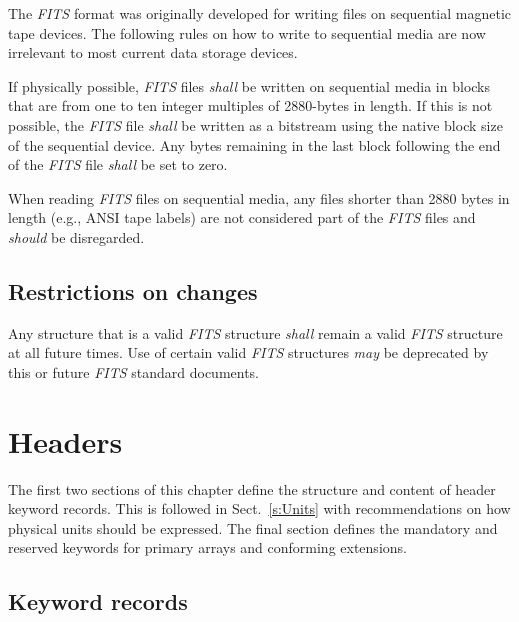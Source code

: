 \documentclass[onecolumn]{aa}
\begin{document}
The {\em FITS\/} format was originally developed for writing files
on sequential magnetic tape devices.  The following rules on how to write
to sequential media \citep{grosbol94} are now irrelevant to most current data storage
devices.

If physically possible, {\em FITS\/} files {\em shall} be written on sequential 
media in blocks that are from one to ten integer multiples of
2880-bytes in length.  If this is not possible, the {\em FITS\/} file {\em shall}
be written as a bitstream using the native block size of the sequential device.
Any bytes remaining in the last block following  the end of the 
{\em FITS\/} file {\em shall} be set to zero.

When reading {\em FITS\/} files on sequential media, any files 
shorter than 2880 bytes in length (e.g., ANSI tape labels)
are not considered part of the {\em FITS\/} files and {\em should} be disregarded.

  \subsection{Restrictions on changes}
  \label{s:Restrict}
   Any structure that is a valid {\em FITS\/} 
   structure {\em shall} remain 
   a valid {\em FITS\/} structure at all future times. 
   Use of certain 
   valid {\em FITS\/} structures {\em may} be 
   deprecated by this or 
   future {\em FITS\/} standard documents.
     

\section{Headers}
  \label{s:head}
  
 The first two sections of this chapter define the structure and content of header 
 keyword records.  This is followed in Sect.\ \ref{s:Units} with recommendations
 on how physical units should be expressed.  The final section defines the
 mandatory and reserved keywords for primary arrays and conforming extensions.
  
  \subsection{Keyword records}
  
\end{document}

